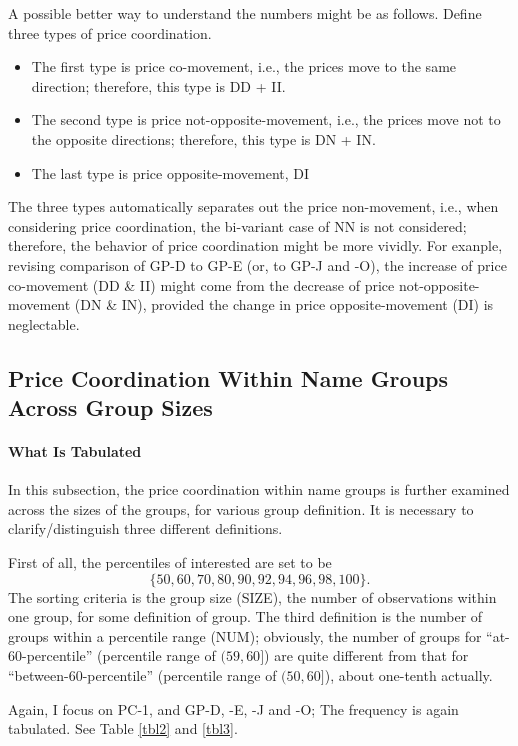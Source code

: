 A possible better way to understand the numbers might be as follows. Define three types of price coordination.
\begin{itemize}
	\item The first type is price co-movement, i.e., the prices move to the same direction; therefore, this type is DD + II.
	\item The second type is price not-opposite-movement, i.e., the prices move not to the opposite directions; therefore, this type is DN + IN.
	\item The last type is price opposite-movement, DI
\end{itemize}
The three types automatically separates out the price non-movement, i.e., when considering price coordination, the bi-variant case of NN is not considered; therefore, the behavior of price coordination might be more vividly. For exanple, revising comparison of GP-D to GP-E (or, to GP-J and -O), the increase of price co-movement (DD \& II) might come from the decrease of price not-opposite-movement (DN \& IN), provided the change in price opposite-movement (DI) is neglectable.

\subsection{Price Coordination Within Name Groups Across Group Sizes}

\paragraph{What Is Tabulated}

In this subsection, the price coordination within name groups is further examined across the sizes of the groups, for various group definition. It is necessary to clarify/distinguish three different definitions.

First of all, the percentiles of interested are set to be \[ \{50,60,70, 80, 90, 92, 94, 96,  98, 100\}. \] The sorting criteria is the group size (SIZE), the number of observations within one group, for some definition of group. The third definition is the number of groups within a percentile range (NUM); obviously, the number of groups for ``at-60-percentile'' (percentile range of $ (59,60] $) are quite different from that for ``between-60-percentile'' (percentile range of $ (50,60] $), about one-tenth actually.

Again, I focus on PC-1, and GP-D, -E, -J and -O; The frequency is again tabulated. See Table \ref{tbl2} and \ref{tbl3}.

